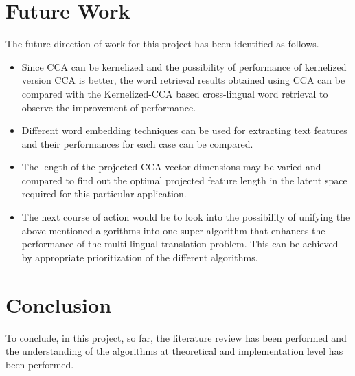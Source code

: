 \documentclass{article} %
\begin{document}
\section{Future Work}
The future direction of work for this project has been identified as follows.
\begin{itemize}
\item Since CCA can be kernelized and the possibility of performance of kernelized version CCA is better, the word retrieval results obtained using CCA can be compared with the Kernelized-CCA based cross-lingual word retrieval to observe the improvement of performance.
\item Different word embedding techniques can be used for extracting text features and their performances for each case can be compared.
\item The length of the projected CCA-vector dimensions may be varied and compared to find out the optimal projected feature length in the latent space required for this particular application.
\item The next course of action would be to look into the possibility of unifying the above mentioned algorithms into one super-algorithm that enhances the performance of the multi-lingual translation problem. This can be achieved by appropriate prioritization of the different algorithms.
\end{itemize}
 




\section{Conclusion}
To conclude, in this project, so far, the literature review has been performed and the understanding of the algorithms at theoretical and implementation level has been performed. 


\end{document}
